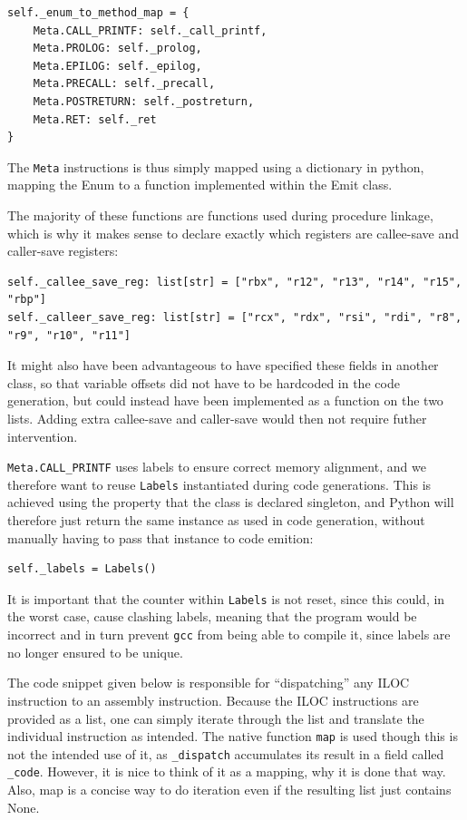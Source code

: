 \begin{verbatim}
self._enum_to_method_map = {
    Meta.CALL_PRINTF: self._call_printf,
    Meta.PROLOG: self._prolog,
    Meta.EPILOG: self._epilog,
    Meta.PRECALL: self._precall,
    Meta.POSTRETURN: self._postreturn,
    Meta.RET: self._ret
}
\end{verbatim}

The \texttt{Meta} instructions is thus simply mapped using a dictionary in python, mapping the Enum to a function implemented within the Emit class.

The majority of these functions are functions used during procedure linkage, which is why it makes sense to declare exactly which registers are callee-save and caller-save registers:

\begin{verbatim}
self._callee_save_reg: list[str] = ["rbx", "r12", "r13", "r14", "r15", "rbp"]
self._calleer_save_reg: list[str] = ["rcx", "rdx", "rsi", "rdi", "r8", "r9", "r10", "r11"]
\end{verbatim}

It might also have been advantageous to have specified these fields in another class, so that variable offsets did not have to be hardcoded in the code generation, but could instead have been implemented as a function on the two lists. Adding extra callee-save and caller-save would then not require futher intervention.

\texttt{Meta.CALL\_PRINTF} uses labels to ensure correct memory alignment, and we therefore want to reuse \texttt{Labels} instantiated during code generations. This is achieved using the property that the class is declared singleton, and Python will therefore just return the same instance as used in code generation, without manually having to pass that instance to code emition:

\begin{verbatim}
self._labels = Labels()
\end{verbatim}

It is important that the counter within \texttt{Labels} is not reset, since this could, in the worst case, cause clashing labels, meaning that the program would be incorrect and in turn prevent \texttt{gcc} from being able to compile it, since labels are no longer ensured to be unique.

The code snippet given below is responsible for ``dispatching'' any ILOC instruction to an assembly instruction. Because the ILOC instructions are provided as a list, one can simply iterate through the list and translate the individual instruction as intended. The native function \texttt{map} is used though this is not the intended use of it, as \texttt{\_dispatch} accumulates its result in a field called \texttt{\_code}. However, it is nice to think of it as a mapping, why it is done that way. Also, map is a concise way to do iteration even if the resulting list just contains None.

